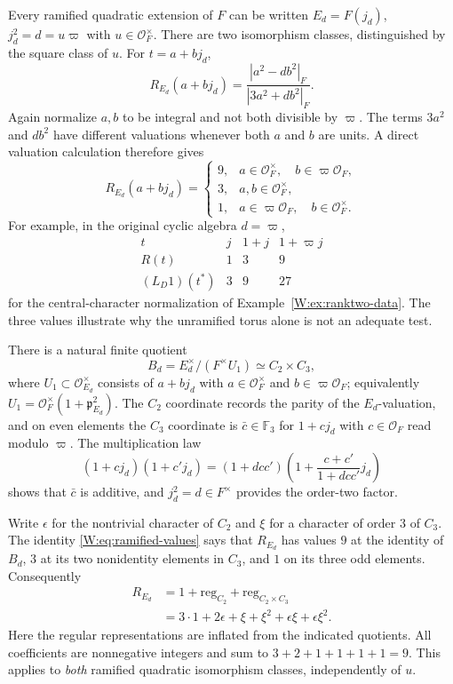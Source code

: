 Every ramified quadratic extension of $F$ can be written
$E_d=F(j_d)$, $j_d^2=d=u\varpi$ with $u\in\mathcal O_F^\times$.
There are two isomorphism classes, distinguished by the square
class of $u$.  For $t=a+bj_d$,
\begin{equation}\label{W:eq:ramified-R}
 R_{E_d}(a+bj_d)
 =\frac{|a^2-db^2|_F}{|3a^2+db^2|_F}.
\end{equation}
Again normalize $a,b$ to be integral and not both divisible
by $\varpi$.  The terms $3a^2$ and $db^2$ have different
valuations whenever both $a$ and $b$ are units.  A direct
valuation calculation therefore gives
\begin{equation}\label{W:eq:ramified-values}
 R_{E_d}(a+bj_d)=
 \begin{cases}
 9,& a\in\mathcal O_F^\times,
       \quad b\in\varpi\mathcal O_F,\\
 3,& a,b\in\mathcal O_F^\times,\\
 1,& a\in\varpi\mathcal O_F,
       \quad b\in\mathcal O_F^\times.
 \end{cases}
\end{equation}
For example, in the original cyclic algebra $d=\varpi$,
\[
 \begin{array}{c|ccc}
 t&j&1+j&1+\varpi j\\\hline
 R(t)&1&3&9\\
 (L_D1)(t^*)&3&9&27
 \end{array}
\]
for the central-character normalization of Example~\ref{W:ex:ranktwo-data}.
The three values illustrate why the unramified torus alone is not
an adequate test.

There is a natural finite quotient
\[
 B_d=E_d^\times/(F^\times U_1)\simeq C_2\times C_3,
\]
where $U_1\subset\mathcal O_{E_d}^\times$ consists of
$a+bj_d$ with $a\in\mathcal O_F^\times$ and
$b\in\varpi\mathcal O_F$; equivalently
$U_1=\mathcal O_F^\times(1+\mathfrak p_{E_d}^2)$.  The $C_2$ coordinate
records the parity of the $E_d$-valuation, and on even elements
the $C_3$ coordinate is $\bar c\in\mathbb F_3$ for
$1+cj_d$ with $c\in\mathcal O_F$ read modulo $\varpi$.  The multiplication law
\[
 (1+cj_d)(1+c'j_d)
 =(1+dcc')\left(1+\frac{c+c'}{1+dcc'}j_d\right)
\]
shows that $\bar c$ is additive, and $j_d^2=d\in F^\times$
provides the order-two factor.

Write $\epsilon$ for the nontrivial character of $C_2$
and $\xi$ for a character of order $3$ of $C_3$.
The identity \eqref{W:eq:ramified-values} says that $R_{E_d}$
has values $9$ at the identity of $B_d$, $3$ at its two
nonidentity elements in $C_3$, and $1$ on its three odd elements.
Consequently
\begin{equation}\label{W:eq:ram-fourier}
 \boxed{\quad
 \begin{aligned}
 R_{E_d}
 &=1+\mathrm{reg}_{C_2}+\mathrm{reg}_{C_2\times C_3}\\
 &=3\cdot1+2\epsilon
   +\xi+\xi^2+\epsilon\xi+\epsilon\xi^2.
 \end{aligned}\quad}
\end{equation}
Here the regular representations are inflated from the indicated
quotients.  All coefficients are nonnegative integers and sum
to $3+2+1+1+1+1=9$.  This applies to \emph{both} ramified
quadratic isomorphism classes, independently of $u$.


